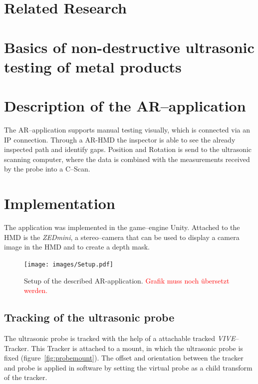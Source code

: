 \documentclass{VRARWorkshop}
\begin{document}
\section{Related Research}
\cite{ARPat15}
\cite{ARClean}
\cite{schwerdtfeger_using_2008}
\cite{fadzil_design_2015}
\cite{walter_non-contact_2007}

\section{Basics of non-destructive ultrasonic testing of metal products}
\cite{deutsch_zfp_2010}
\cite{moles_introduction_2004}
\cite{olympus_Grundlagen}

\section{Description of the AR--application}
The AR--application supports manual testing visually, which is connected via an IP connection.
Through a AR-HMD the inspector is able to see the already inspected path and identify gaps.
Position and Rotation is send to the ultrasonic scanning computer, where the data is combined with the measurements received by the probe into a C--Scan.

\section{Implementation}
The application was implemented in the game--engine Unity.
Attached to the HMD is the \textit{ZEDmini}, a stereo--camera that can be used to display a camera image in the HMD and to create a depth mask.

\cite{dorner_virtual_2013}

\begin{figure}[h!]
    \begin{center}
        \texttt{[image: images/Setup.pdf]}
        \caption{\label{fig:Setup} Setup of the described AR-application. \textcolor{red}{Grafik muss noch übersetzt werden.}}
    \end{center}
\end{figure}

\subsection{Tracking of the ultrasonic probe}
The ultrasonic probe is tracked with the help of a attachable tracked \textit{VIVE}--Tracker.
This Tracker is attached to a mount, in which the ultrasonic probe is fixed (figure~\ref{fig:probemount}).
The offset and orientation between the tracker and probe is applied in software by setting the virtual probe as a child transform of the tracker.
\end{document}
